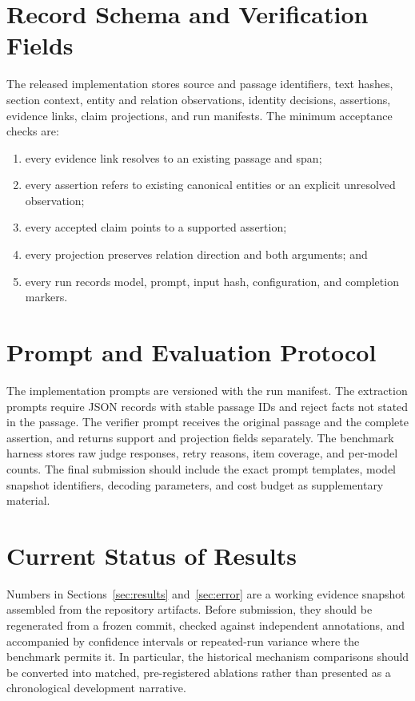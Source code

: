 \documentclass[11pt]{article}
\begin{document}



\appendix
\section{Record Schema and Verification Fields}
\label{app:schema}

The released implementation stores source and passage identifiers, text hashes, section context, entity and relation observations, identity decisions, assertions, evidence links, claim projections, and run manifests. The minimum acceptance checks are:
\begin{enumerate}
  \item every evidence link resolves to an existing passage and span;
  \item every assertion refers to existing canonical entities or an explicit unresolved observation;
  \item every accepted claim points to a supported assertion;
  \item every projection preserves relation direction and both arguments; and
  \item every run records model, prompt, input hash, configuration, and completion markers.
\end{enumerate}

\section{Prompt and Evaluation Protocol}
\label{app:protocol}

The implementation prompts are versioned with the run manifest. The extraction prompts require JSON records with stable passage IDs and reject facts not stated in the passage. The verifier prompt receives the original passage and the complete assertion, and returns support and projection fields separately. The benchmark harness stores raw judge responses, retry reasons, item coverage, and per-model counts. The final submission should include the exact prompt templates, model snapshot identifiers, decoding parameters, and cost budget as supplementary material.

\section{Current Status of Results}
\label{app:status}

Numbers in Sections~\ref{sec:results} and~\ref{sec:error} are a working evidence snapshot assembled from the repository artifacts. Before submission, they should be regenerated from a frozen commit, checked against independent annotations, and accompanied by confidence intervals or repeated-run variance where the benchmark permits it. In particular, the historical mechanism comparisons should be converted into matched, pre-registered ablations rather than presented as a chronological development narrative.
\end{document}
